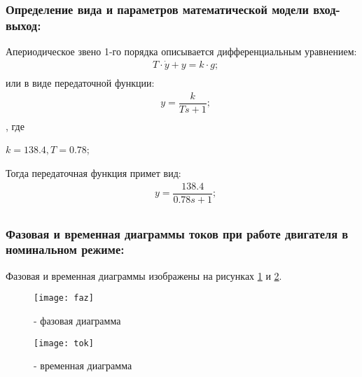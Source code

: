 \subsubsection{Определение вида и параметров математической модели вход-выход:}

Апериодическое звено 1-го порядка описывается дифференциальным уравнением: 
\begin{equation}
	\begin{split}
		&T\cdot \dot{y}+y=k\cdot g;\\
	\end{split}
\end{equation}
или в виде передаточной функции:
\begin{equation}
	\begin{split}
		&y=\dfrac{k}{Ts+1};\\
	\end{split}
\end{equation}
, где
\begin{center}
	$k=138.4, T=0.78$;
\end{center}
Тогда передаточная функция примет вид:
\begin{equation}
	\begin{split}
		&y=\dfrac{138.4}{0.78s+1};\\
	\end{split}
\end{equation}

\newpage

\subsubsection{Фазовая и временная диаграммы токов при работе двигателя в номинальном режиме:}
Фазовая и временная диаграммы изображены на рисунках \ref{pic:pic_3} и \ref{pic:pic_4}.
\begin{figure}[H]
	\begin{center}
		\texttt{[image: faz]}
		\caption{- фазовая диаграмма} 
		\label{pic:pic_3} %
	\end{center}
\end{figure}

\begin{figure}[H]
	\begin{center}
		\texttt{[image: tok]}
		\caption{- временная диаграмма} 
		\label{pic:pic_4} %
	\end{center}
\end{figure}

